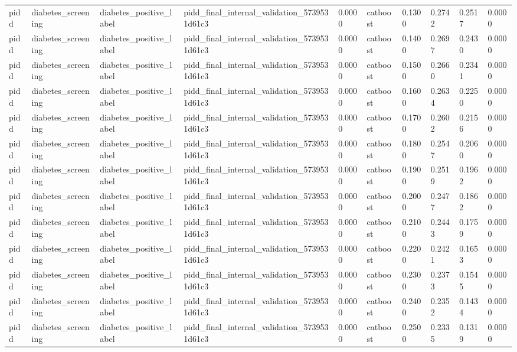 \begin{tabular}{llllllllll}
pidd & diabetes\_screening & diabetes\_positive\_label & pidd\_final\_internal\_validation\_5739531d61c3 & 0.0000 & catboost & 0.1300 & 0.2742 & 0.2517 & 0.0000 \\
pidd & diabetes\_screening & diabetes\_positive\_label & pidd\_final\_internal\_validation\_5739531d61c3 & 0.0000 & catboost & 0.1400 & 0.2697 & 0.2430 & 0.0000 \\
pidd & diabetes\_screening & diabetes\_positive\_label & pidd\_final\_internal\_validation\_5739531d61c3 & 0.0000 & catboost & 0.1500 & 0.2660 & 0.2341 & 0.0000 \\
pidd & diabetes\_screening & diabetes\_positive\_label & pidd\_final\_internal\_validation\_5739531d61c3 & 0.0000 & catboost & 0.1600 & 0.2634 & 0.2250 & 0.0000 \\
pidd & diabetes\_screening & diabetes\_positive\_label & pidd\_final\_internal\_validation\_5739531d61c3 & 0.0000 & catboost & 0.1700 & 0.2602 & 0.2156 & 0.0000 \\
pidd & diabetes\_screening & diabetes\_positive\_label & pidd\_final\_internal\_validation\_5739531d61c3 & 0.0000 & catboost & 0.1800 & 0.2547 & 0.2060 & 0.0000 \\
pidd & diabetes\_screening & diabetes\_positive\_label & pidd\_final\_internal\_validation\_5739531d61c3 & 0.0000 & catboost & 0.1900 & 0.2519 & 0.1962 & 0.0000 \\
pidd & diabetes\_screening & diabetes\_positive\_label & pidd\_final\_internal\_validation\_5739531d61c3 & 0.0000 & catboost & 0.2000 & 0.2477 & 0.1862 & 0.0000 \\
pidd & diabetes\_screening & diabetes\_positive\_label & pidd\_final\_internal\_validation\_5739531d61c3 & 0.0000 & catboost & 0.2100 & 0.2443 & 0.1759 & 0.0000 \\
pidd & diabetes\_screening & diabetes\_positive\_label & pidd\_final\_internal\_validation\_5739531d61c3 & 0.0000 & catboost & 0.2200 & 0.2421 & 0.1653 & 0.0000 \\
pidd & diabetes\_screening & diabetes\_positive\_label & pidd\_final\_internal\_validation\_5739531d61c3 & 0.0000 & catboost & 0.2300 & 0.2373 & 0.1545 & 0.0000 \\
pidd & diabetes\_screening & diabetes\_positive\_label & pidd\_final\_internal\_validation\_5739531d61c3 & 0.0000 & catboost & 0.2400 & 0.2352 & 0.1434 & 0.0000 \\
pidd & diabetes\_screening & diabetes\_positive\_label & pidd\_final\_internal\_validation\_5739531d61c3 & 0.0000 & catboost & 0.2500 & 0.2335 & 0.1319 & 0.0000 \\

\end{tabular}
